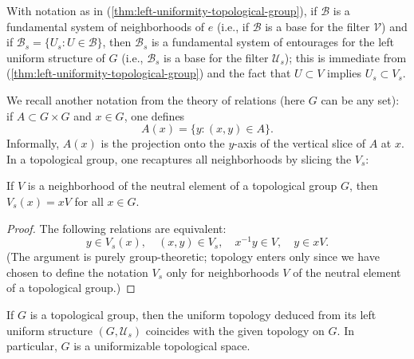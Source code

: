 \begin{proposition}
    \label{prop:left-uniformity-base-top-group}

    With notation as in (\ref{thm:left-uniformity-topological-group}), if \( \mathscr{B} \) is a fundamental system of neighborhoods of \( e \) (i.e., if \( \mathscr{B} \) is a base for the filter \( \mathscr{V} \)) and if \( \mathscr{B}_s = \{ U_s : U \in \mathscr{B} \} \), then \( \mathscr{B}_s \) is a fundamental system of entourages for the left uniform structure of \( G \)
    (i.e., \( \mathscr{B}_s \) is a base for the filter \( \mathscr{U}_s \)); this is immediate from (\ref{thm:left-uniformity-topological-group}) and the fact that \( U \subset V \) implies \( U_s \subset V_s \).
\end{proposition}

\begin{definition}
    We recall another notation from the theory of relations (here \( G \) can be any set):
    if \( A \subset G \times G \) and \( x \in G \), one defines
    \[
        A(x) = \{ y : (x, y) \in A \}.
    \]
    Informally, \( A(x) \) is the projection onto the \( y \)-axis of the vertical slice of \( A \) at \( x \).
    In a topological group, one recaptures all neighborhoods by slicing the \( V_s \):
\end{definition}

\begin{lemma}
    If \( V \) is a neighborhood of the neutral element of a topological group \( G \),
    then \( V_s(x) = xV \) for all \( x \in G \).
\end{lemma}

\begin{proof}
    The following relations are equivalent:
    \[
        y \in V_s(x), \quad (x, y) \in V_s, \quad x^{-1}y \in V, \quad y \in xV.
    \]
    (The argument is purely group-theoretic; topology enters only since we have chosen to define the notation \( V_s \)
    only for neighborhoods \( V \) of the neutral element of a topological group.)
\end{proof}


\begin{theorem}
    \label{thm:left-uniformity-induces-topology}

    If \( G \) is a topological group, then the uniform topology deduced from its left uniform structure \( (G, \mathscr{U}_s) \) coincides with the given topology on \( G \). In particular, \( G \) is a uniformizable topological space.
\end{theorem}

